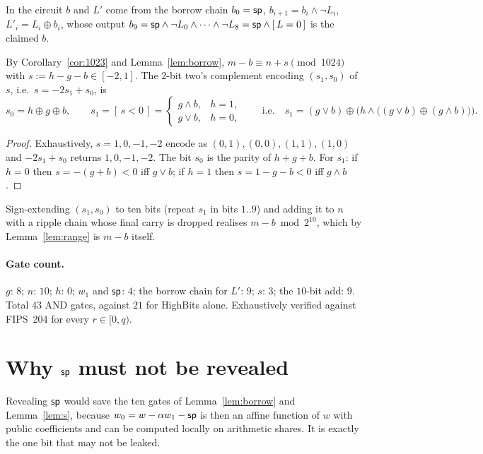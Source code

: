 In the circuit $b$ and $L'$ come from the borrow chain
$b_0=\mathsf{sp}$, $b_{i+1}=b_i\wedge\neg L_i$, $L'_i=L_i\oplus b_i$, whose output
$b_9=\mathsf{sp}\wedge\neg L_0\wedge\cdots\wedge\neg L_8=\mathsf{sp}\wedge[\,L=0\,]$ is the
claimed $b$.

\begin{lemma}\label{lem:s}
By Corollary~\ref{cor:1023} and Lemma~\ref{lem:borrow},
$m-b\equiv n+s \pmod{1024}$ with $s:=h-g-b\in[-2,1]$. The $2$-bit two's
complement encoding $(s_1,s_0)$ of $s$, i.e.\ $s=-2s_1+s_0$, is
\[
  s_0=h\oplus g\oplus b,\qquad
  s_1=[\,s<0\,]=
  \begin{cases} g\wedge b, & h=1,\\ g\vee b, & h=0,\end{cases}
  \qquad\text{i.e.}\quad
  s_1=(g\vee b)\oplus\big(h\wedge\big((g\vee b)\oplus(g\wedge b)\big)\big).
\]
\end{lemma}

\begin{proof}
Exhaustively, $s=1,0,-1,-2$ encode as $(0,1),(0,0),(1,1),(1,0)$ and
$-2s_1+s_0$ returns $1,0,-1,-2$. The bit $s_0$ is the parity of $h+g+b$. For
$s_1$: if $h=0$ then $s=-(g+b)<0$ iff $g\vee b$; if $h=1$ then $s=1-g-b<0$ iff
$g\wedge b$.
\end{proof}

Sign-extending $(s_1,s_0)$ to ten bits (repeat $s_1$ in bits $1..9$) and adding
it to $n$ with a ripple chain whose final carry is dropped realises
$m-b \bmod 2^{10}$, which by Lemma~\ref{lem:range} is $m-b$ itself.

\paragraph{Gate count.}
$g$: $8$; $n$: $10$; $h$: $0$; $w_1$ and $\mathsf{sp}$: $4$; the borrow chain for
$L'$: $9$; $s$: $3$; the $10$-bit add: $9$. Total $43$ AND gates, against $21$
for \textsf{HighBits} alone. Exhaustively verified against FIPS~204 for every
$r\in[0,q)$.

\section{Why $\mathsf{sp}$ must not be revealed}

Revealing $\mathsf{sp}$ would save the ten gates of Lemma~\ref{lem:borrow} and
Lemma~\ref{lem:s}, because $w_0=w-\alpha w_1-\mathsf{sp}$ is then an affine function of
$w$ with public coefficients and can be computed locally on arithmetic shares.
It is exactly the one bit that may not be leaked.


